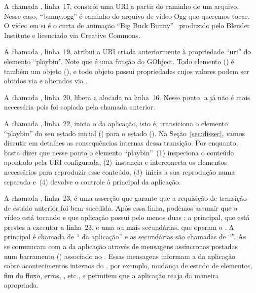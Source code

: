 \documentclass{SBCbookchapter}
\begin{document}
A chamada , linha~17, constrói uma URI a partir do
caminho de um arquivo.  Nesse caso, ``bunny.ogg'' é caminho do arquivo de
vídeo Ogg que queremos tocar.  O vídeo em si é o curta de animação ``Big
Buck Bunny''~\cite{bunny} produzido pelo Blender Institute e licenciado via
Creative Commons.

A chamada , linha~19, atribui a URI criada anteriormente à
propriedade ``uri'' do elemento ``playbin''.  Note que  é
uma função do GObject.  Todo elemento () é também um objeto
(), e todo objeto possui propriedades cujos valores podem ser
obtidos via  e alterados via .

A chamada , linha~20, libera a  alocada na linha~16.
Nesse ponto, a  já não é mais necessária pois foi copiada pela
chamada  anterior.

A chamada , linha~22, inicia o  da
aplicação, isto é, transiciona o elemento ``playbin'' do seu estado inicial
 () para o estado 
().  Na Seção~\ref{sec:dissec}, vamos discutir em
detalhes as consequências internas dessa transição.  Por enquanto, basta
dizer que nesse ponto o elemento ``playbin''~(1) inspeciona o conteúdo
apontado pela URI configurada, (2)~instancia e interconecta os elementos
necessários para reproduzir esse conteúdo, (3)~inicia a sua reprodução numa
 separada e~(4) devolve o controle à  principal da
aplicação.

A chamada , linha~23, é uma asserção que garante que a
requisição de transição de estado anterior foi bem sucedida.  Após essa
linha, podemos assumir que o vídeo está tocando e que aplicação possui pelo
menos duas : a  principal, que está prestes a
executar a linha~23, e uma ou mais  secundárias, que operam o
.  A  principal é chamada de `` da
aplicação'' e as  secundárias são chamadas de ``''.  As  se comunicam com a  da
aplicação através de mensagens assíncronas postadas num barramento
() associado ao .  Essas mensagens informam a
 da aplicação sobre acontecimentos internos do , por
exemplo, mudança de estado de elementos, fim do fluxo, erros, ,
etc., e permitem que a aplicação reaja da maneira apropriada.
\end{document}
